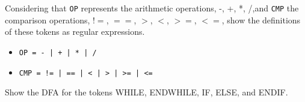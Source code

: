 \documentclass[docid=2017]{comp_test1}
\begin{document}
\question
Considering that \texttt{OP} represents the arithmetic operations, -, +, *, /,and \texttt{CMP} the comparison operations, $!=$, $==$, $>$, $<$, $>=$, $<=$, show the definitions of these tokens as regular expressions.

\clearpage

\ansseparator

\begin{itemize}[wide, noitemsep, label={}]
    \item \texttt{OP = - | + | * | /}
    \item \texttt{CMP = != | == | < | > | >= | <=}
\end{itemize}

\question
Show the DFA for the tokens WHILE, ENDWHILE, IF, ELSE, and ENDIF.

\ansseparator
\end{document}
